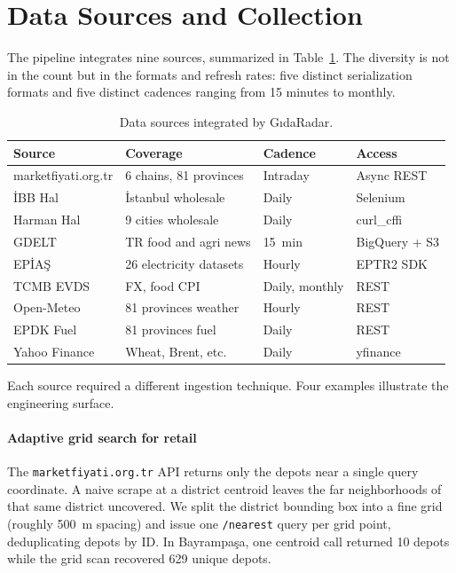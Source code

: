 \documentclass[conference]{IEEEtran}
\begin{document}
\section{Data Sources and Collection}
\label{sec:data}

The pipeline integrates nine sources, summarized in Table~\ref{tab:sources}. The diversity is not in the count but in the formats and refresh rates: five distinct serialization formats and five distinct cadences ranging from 15 minutes to monthly.

\begin{table}[!t]
\caption{Data sources integrated by GıdaRadar.}
\label{tab:sources}
\centering
\footnotesize
\begin{tabular}{@{}p{2.05cm}p{1.95cm}p{1.25cm}p{1.55cm}@{}}
\toprule
\textbf{Source} & \textbf{Coverage} & \textbf{Cadence} & \textbf{Access} \\
\midrule
marketfiyati.org.tr & 6 chains, 81 provinces & Intraday & Async REST \\
İBB Hal & İstanbul wholesale & Daily & Selenium \\
Harman Hal & 9 cities wholesale & Daily & curl\_cffi \\
GDELT & TR food and agri news & 15~min & BigQuery + S3 \\
EPİAŞ & 26 electricity datasets & Hourly & EPTR2 SDK \\
TCMB EVDS & FX, food CPI & Daily, monthly & REST \\
Open-Meteo & 81 provinces weather & Hourly & REST \\
EPDK Fuel & 81 provinces fuel & Daily & REST \\
Yahoo Finance & Wheat, Brent, etc. & Daily & yfinance \\
\bottomrule
\end{tabular}
\end{table}

Each source required a different ingestion technique. Four examples illustrate the engineering surface.

\paragraph{Adaptive grid search for retail} The \texttt{marketfiyati.org.tr} API returns only the depots near a single query coordinate. A naive scrape at a district centroid leaves the far neighborhoods of that same district uncovered. We split the district bounding box into a fine grid (roughly 500~m spacing) and issue one \texttt{/nearest} query per grid point, deduplicating depots by ID. In Bayrampaşa, one centroid call returned 10 depots while the grid scan recovered 629 unique depots.
\end{document}

